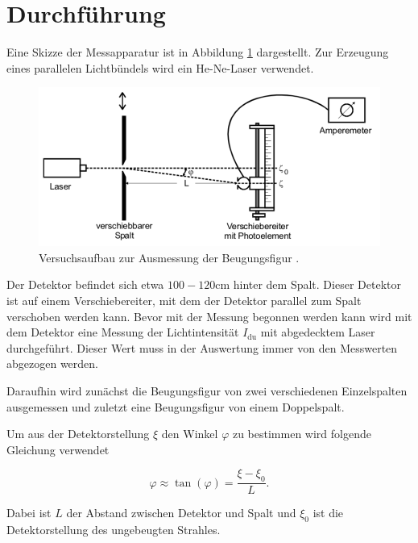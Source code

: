 \section{Durchführung}

Eine Skizze der Messapparatur ist in Abbildung \ref{abb:3} dargestellt. Zur Erzeugung
eines parallelen Lichtbündels wird ein He-Ne-Laser verwendet.

\begin{figure}[H]
  \centering
  \includegraphics[width=\textwidth]{content/Versuchsaufbau.png}
  \caption{Versuchsaufbau zur Ausmessung der Beugungsfigur \cite{1}.}
  \label{abb:3}
\end{figure}

Der Detektor befindet sich etwa $100-120 \si{\centi\meter}$ hinter dem Spalt.
Dieser Detektor ist auf einem Verschiebereiter, mit dem der Detektor parallel zum
Spalt verschoben werden kann.
Bevor mit der Messung begonnen werden kann wird mit dem Detektor eine Messung der
Lichtintensität $I_{\text{du}}$ mit abgedecktem Laser durchgeführt. Dieser Wert muss
in der Auswertung immer von den Messwerten abgezogen werden.

Daraufhin wird zunächst die Beugungsfigur von zwei verschiedenen Einzelspalten
ausgemessen und zuletzt eine Beugungsfigur von einem Doppelspalt.

Um aus der Detektorstellung $\xi$ den Winkel $\varphi$ zu bestimmen wird folgende
Gleichung verwendet

\begin{equation}
  \varphi \approx \tan(\varphi) = \frac{\xi - \xi_0}{L}.
  \label{eq:3}
\end{equation}

Dabei ist $L$ der Abstand zwischen Detektor und Spalt und $\xi_0$ ist die Detektorstellung
des ungebeugten Strahles.
